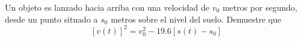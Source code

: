 \item Un objeto es lanzado hacia arriba con una velocidad de $v_0$ metros por segundo, desde un punto situado a $s_0$ metros sobre el nivel del suelo. Demuestre que $$[v(t)]^2 = v_0^2 - 19.6[s(t) - s_0]$$
